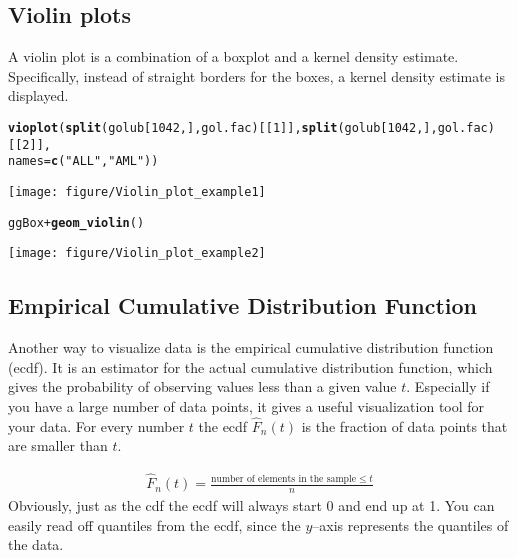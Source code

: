 \documentclass{article}\usepackage[]{graphicx}\usepackage[usenames,dvipsnames]{color}
\makeatletter
\def\maxwidth{ %
  \ifdim\Gin@nat@width>\linewidth
    \linewidth
  \else
    \Gin@nat@width
  \fi
}
\newcommand{\hlnum}[1]{\textcolor[rgb]{0.686,0.059,0.569}{#1}}%
\newcommand{\hlstr}[1]{\textcolor[rgb]{0.192,0.494,0.8}{#1}}%
\newcommand{\hlopt}[1]{\textcolor[rgb]{0,0,0}{#1}}%
\newcommand{\hlstd}[1]{\textcolor[rgb]{0.345,0.345,0.345}{#1}}%
\newcommand{\hlkwc}[1]{\textcolor[rgb]{0.333,0.667,0.333}{#1}}%
\newcommand{\hlkwd}[1]{\textcolor[rgb]{0.737,0.353,0.396}{\textbf{#1}}}%
\newenvironment{kframe}{%
 \def\at@end@of@kframe{}%
 \ifinner\ifhmode%
  \def\at@end@of@kframe{\end{minipage}}%
  \begin{minipage}{\columnwidth}%
 \fi\fi%
 \def\FrameCommand##1{\hskip\@totalleftmargin \hskip-\fboxsep
 \colorbox{shadecolor}{##1}\hskip-\fboxsep
     \hskip-\linewidth \hskip-\@totalleftmargin \hskip\columnwidth}%
 \MakeFramed {\advance\hsize-\width
   \@totalleftmargin\z@ \linewidth\hsize
   \@setminipage}}%
 {\par\unskip\endMakeFramed%
 \at@end@of@kframe}
\newenvironment{knitrout}{}{} %
\makeatother
\begin{document}
\subsection{Violin plots}

A violin plot is a combination of a boxplot and a kernel density estimate. 
Specifically, instead of straight borders for the boxes, a kernel density estimate
is displayed. 

\begin{knitrout}
\color{fgcolor}\begin{kframe}
\begin{alltt}
\hlkwd{vioplot}\hlstd{(}\hlkwd{split}\hlstd{(golub[}\hlnum{1042}\hlstd{,],  gol.fac)[[}\hlnum{1}\hlstd{]],} \hlkwd{split}\hlstd{(golub[}\hlnum{1042}\hlstd{,],  gol.fac)[[}\hlnum{2}\hlstd{]],}
        \hlkwc{names} \hlstd{=} \hlkwd{c}\hlstd{(}\hlstr{"ALL"}\hlstd{,} \hlstr{"AML"}\hlstd{))}
\end{alltt}
\end{kframe}
\texttt{[image: figure/Violin\_plot\_example1]} 
\begin{kframe}\begin{alltt}
\hlstd{ggBox} \hlopt{+} \hlkwd{geom_violin}\hlstd{()}
\end{alltt}
\end{kframe}
\texttt{[image: figure/Violin\_plot\_example2]} 

\end{knitrout}


\subsection{Empirical Cumulative Distribution Function}
Another way to visualize data is the empirical cumulative distribution function 
(ecdf). It is an estimator for the actual  cumulative distribution function,
which gives the probability of observing values less than a given value $t$.
Especially if you have a large number
of data points, it gives a useful visualization tool for your data.
For every number $t$ the ecdf  $\hat F_n(t)$ is the fraction of data points
that are smaller than $t$.

\begin{gather*}
    \hat F_n(t) = \frac{ \mbox{number of elements in the sample} \leq t}n  
\end{gather*}
Obviously, just as the cdf the ecdf will always start 0 and end up at
1. You can easily read off quantiles from the ecdf, since the $y$--axis
represents the quantiles of the data. 
\end{document}

